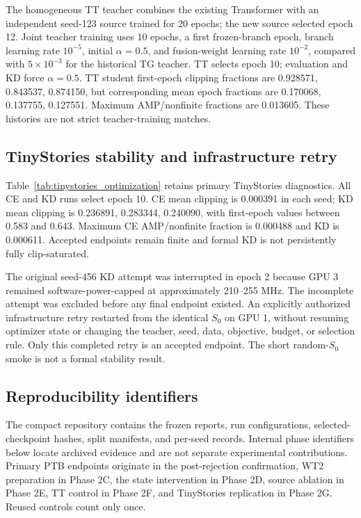 The homogeneous TT teacher combines the existing Transformer with an independent seed-123 source trained for 20 epochs; the new source selected epoch 12. Joint teacher training uses 10 epochs, a first frozen-branch epoch, branch learning rate $10^{-5}$, initial $\alpha=0.5$, and fusion-weight learning rate $10^{-2}$, compared with $5\times10^{-3}$ for the historical TG teacher. TT selects epoch 10; evaluation and KD force $\alpha=0.5$. TT student first-epoch clipping fractions are 0.928571, 0.843537, 0.874150, but corresponding mean epoch fractions are 0.170068, 0.137755, 0.127551. Maximum AMP/nonfinite fractions are 0.013605. These histories are not strict teacher-training matches.

\subsection{TinyStories stability and infrastructure retry}

Table~\ref{tab:tinystories_optimization} retains primary TinyStories diagnostics. All CE and KD runs select epoch 10. CE mean clipping is 0.000391 in each seed; KD mean clipping is 0.236891, 0.283344, 0.240090, with first-epoch values between 0.583 and 0.643. Maximum CE AMP/nonfinite fraction is 0.000488 and KD is 0.000611. Accepted endpoints remain finite and formal KD is not persistently fully clip-saturated.

The original seed-456 KD attempt was interrupted in epoch 2 because GPU 3 remained software-power-capped at approximately 210--255 MHz. The incomplete attempt was excluded before any final endpoint existed. An explicitly authorized infrastructure retry restarted from the identical $S_0$ on GPU 1, without resuming optimizer state or changing the teacher, seed, data, objective, budget, or selection rule. Only this completed retry is an accepted endpoint. The short random-$S_0$ smoke is not a formal stability result.


\subsection{Reproducibility identifiers}

The compact repository contains the frozen reports, run configurations, selected-checkpoint hashes, split manifests, and per-seed records. Internal phase identifiers below locate archived evidence and are not separate experimental contributions. Primary PTB endpoints originate in the post-rejection confirmation, WT2 preparation in Phase 2C, the state intervention in Phase 2D, source ablation in Phase 2E, TT control in Phase 2F, and TinyStories replication in Phase 2G. Reused controls count only once.

